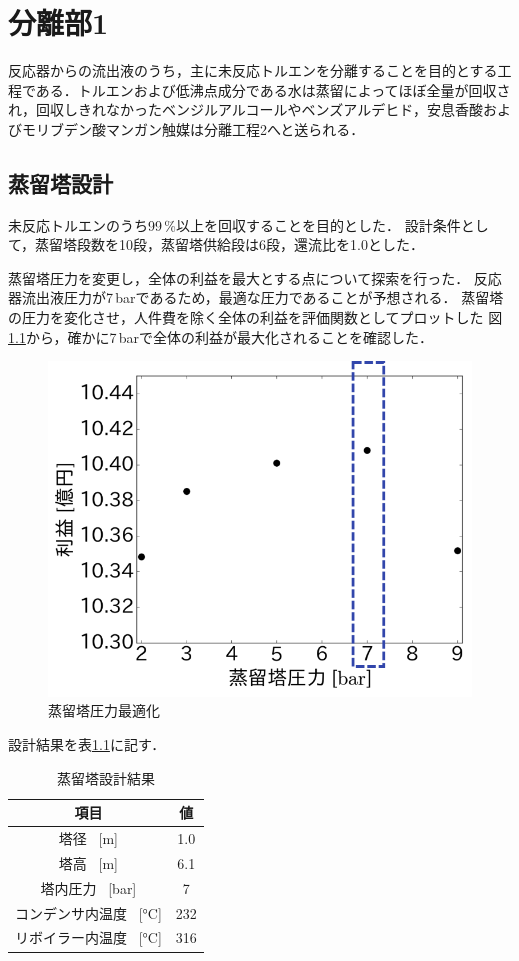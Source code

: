 \documentclass[a4j]{jsreport}
\begin{document}
\clearpage
\chapter{分離部1}
反応器からの流出液のうち，主に未反応トルエンを分離することを目的とする工程である．トルエンおよび低沸点成分である水は蒸留によってほぼ全量が回収され，回収しきれなかったベンジルアルコールやベンズアルデヒド，安息香酸およびモリブデン酸マンガン触媒は分離工程2へと送られる．
\section{蒸留塔設計}
未反応トルエンのうち99\,\%以上を回収することを目的とした．
設計条件として，蒸留塔段数を10段，蒸留塔供給段は6段，還流比を1.0とした．

蒸留塔圧力を変更し，全体の利益を最大とする点について探索を行った．
反応器流出液圧力が7\,\si{\bar}であるため，最適な圧力であることが予想される．
蒸留塔の圧力を変化させ，人件費を除く全体の利益を評価関数としてプロットした
図\ref{蒸留塔圧力最適化}から，確かに7\,\si{\bar}で全体の利益が最大化されることを確認した．
\begin{figure}[htbp]
  \centering
  \includegraphics[scale=0.7]{DistillationPressue.png}
  \caption{蒸留塔圧力最適化}
  \label{蒸留塔圧力最適化}
\end{figure}

設計結果を表\ref{蒸留塔設計結果}に記す．
\begin{table}[htbp]
  \label{蒸留塔設計結果}
  \caption{蒸留塔設計結果}
  \centering
  \begin{tabular}{cc}
      \hline
      項目 & 値 \\
      \hline
      塔径 \, [\si{\metre}] & 1.0 \\
      塔高 \, [\si{\metre}] & 6.1 \\
      塔内圧力 \, [\si{\bar}] &7 \\
      コンデンサ内温度 \, [\si{\degreeCelsius}] & 232 \\
      リボイラー内温度 \, [\si{\degreeCelsius}] & 316 \\
      \hline
  \end{tabular}
\end{table}
\end{document}
